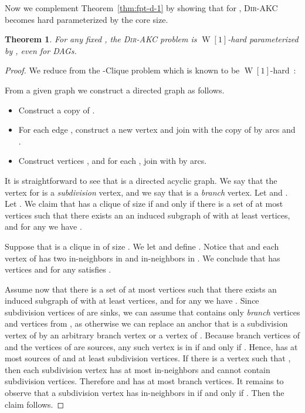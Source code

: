 \documentclass[11pt,a4paper]{article}
\newtheorem{theorem}{Theorem}
\DeclareMathOperator{\operatorClassW}{W}
\newcommand{\classW}[1]{\ensuremath{\operatorClassW[#1]}}
\newcommand{\DAKC}{\textsc{Dir-AKC}\xspace}
\begin{document}
Now we complement Theorem~\ref{thm:fpt-d-1} by showing that for ,  \DAKC becomes hard
parameterized by the core size.

\begin{theorem}\label{thm:w-saved}
For any fixed , the \DAKC problem is \classW1-hard parameterized by , even for DAGs.
\end{theorem}

\begin{proof}
We reduce from the {\sc -Clique} problem which is known to be \classW1-hard~\cite{downey-fellows-book}:

\begin{center}
\noindent{}
\end{center}


From a given graph  we construct a directed graph  as follows.
\begin{itemize}
\item Construct a copy of .
\item For each edge , construct a new vertex  and join   with   the copy of 
    by arcs  and .
\item Construct  vertices , and for each , join  with  by
    arcs.
\end{itemize}
It is straightforward to see that  is a directed acyclic graph. We say that the vertex  for  is a
\emph{subdivision} vertex, and we say that   is a \emph{branch} vertex. Let  and
. Let . We claim that  has a clique of size  if and only if there is a
set of at most  vertices  such that there exists an an induced subgraph  of  with at least 
vertices,  and for any  we have  .

Suppose that  is a clique in  of size . We let  and define . Notice that
 and each vertex of  has two in-neighbors in  and  in-neighbors in . We conclude
that  has  vertices and  for any  satisfies .

Assume now that there is a set of at most  vertices  such that there exists an induced subgraph  of
 with at least  vertices,  and for any  we have  . Since
subdivision vertices of  are sinks, we can assume that  contains only \emph{branch} vertices and vertices from , as
otherwise we can replace an anchor  that is a subdivision vertex of  by an arbitrary branch vertex or a vertex of
. Because branch vertices of  and the vertices of  are sources, any such vertex  is in  if and only if . Hence,  has at most  sources of  and at least  subdivision vertices. If there is a vertex
 such that , then each subdivision vertex  has at most  in-neighbors and  cannot contain
subdivision vertices. Therefore  and  has at most  branch vertices. It remains to observe that a
subdivision vertex  has  in-neighbors in  if and only if . Then the claim follows.
\end{proof}
\end{document}

